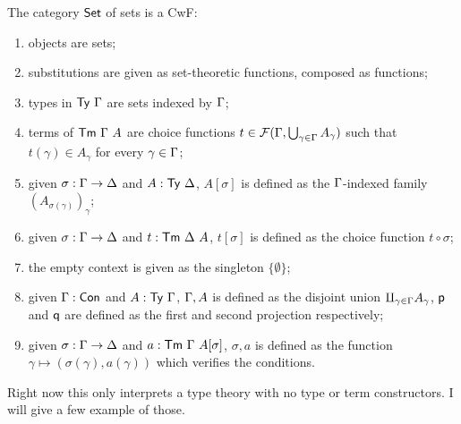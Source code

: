 The category \(\mathsf{Set}\) of sets is a \acrshort{CwF}:
\begin{enumerate}
  \item objects are sets;
  \item substitutions are given as set-theoretic functions, composed as
  functions;
  \item types in \(\mathsf{Ty}\ \Gamma\) are sets indexed by \(\Gamma\);
  \item terms of \(\mathsf{Tm}\ \Gamma\ A\) are choice functions
  \(t \in \mathcal{F}(\Gamma,\bigcup_{\gamma \in \Gamma} A_\gamma)\) such that
  \(t(\gamma) \in A_\gamma\) for every \(\gamma \in \Gamma\);
  \item given \(\sigma : \Gamma \to \Delta\) and \(A : \mathsf{Ty}\ \Delta\), \(A[\sigma]\)
  is defined as the \(\Gamma\)-indexed family \((A_{\sigma(\gamma)})_\gamma\);
  \item given \(\sigma : \Gamma \to \Delta\) and \(t : \mathsf{Tm}\ \Delta\ A\), \(t[\sigma]\)
  is defined as the choice function \(t \circ \sigma\);
  \item the empty context is given as the singleton \(\{ \emptyset \}\);
  \item given \(\Gamma : \mathsf{Con}\) and \(A : \mathsf{Ty}\ \Gamma\), \(\Gamma, A\) is defined as
  the disjoint union \(\amalg_{\gamma \in \Gamma} A_\gamma\), \(\mathsf{p}\) and \(\mathsf{q}\)
  are defined as the first and second projection respectively;
  \item given \(\sigma : \Gamma \to \Delta\) and \(a : \mathsf{Tm}\ \Gamma\ A[\sigma]\),
  \(\sigma, a\) is defined as the function
  \(\gamma \mapsto (\sigma(\gamma), a(\gamma))\) which verifies the conditions.
\end{enumerate}

Right now this only interprets a type theory with no type or term constructors.
I will give a few example of those.


